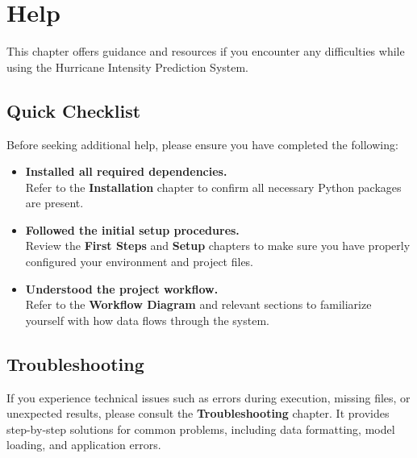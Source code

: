 %
%

\chapter{Help}

This chapter offers guidance and resources if you encounter any difficulties while using the Hurricane Intensity Prediction System.

\section*{Quick Checklist}
Before seeking additional help, please ensure you have completed the following:
\begin{itemize}
	\item \textbf{Installed all required dependencies.} \\
	Refer to the \textbf{Installation} chapter to confirm all necessary Python packages are present.
	\item \textbf{Followed the initial setup procedures.} \\
	Review the \textbf{First Steps} and \textbf{Setup} chapters to make sure you have properly configured your environment and project files.
	\item \textbf{Understood the project workflow.} \\
	Refer to the \textbf{Workflow Diagram} and relevant sections to familiarize yourself with how data flows through the system.
\end{itemize}

\section*{Troubleshooting}
If you experience technical issues such as errors during execution, missing files, or unexpected results, please consult the \textbf{Troubleshooting} chapter. It provides step-by-step solutions for common problems, including data formatting, model loading, and application errors.

